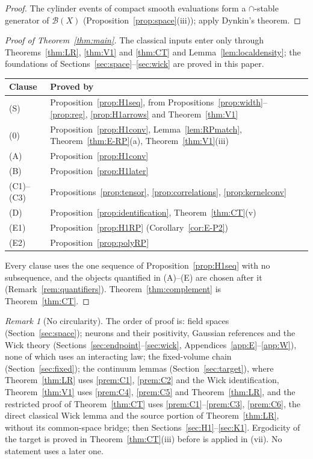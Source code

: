 \documentclass[11pt]{article}
\theoremstyle{plain}
\theoremstyle{definition}
\theoremstyle{remark}
\newtheorem{remark}[theorem]{Remark}
\newcommand{\cB}{\mathcal{B}}
\begin{document}
\begin{proof}
The cylinder events of compact smooth evaluations form a $\cap$-stable generator of
$\cB(X)$ (Proposition~\ref{prop:space}(iii)); apply Dynkin's theorem.
\end{proof}

\begin{proof}[Proof of Theorem~\ref{thm:main}]
The classical inputs enter only through Theorems~\ref{thm:LR}, \ref{thm:V1} and
\ref{thm:CT} and Lemma~\ref{lem:localdensity}; the foundations of
Sections~\ref{sec:space}--\ref{sec:wick} are proved in this paper.
\begin{center}
\small
\begin{tabular}{@{}lp{}@{}}
\toprule
Clause & Proved by\\
\midrule
(S) & Proposition~\ref{prop:H1seq}, from Propositions~\ref{prop:width}--\ref{prop:reg}, \ref{prop:H1arrows} and Theorem~\ref{thm:V1}\\
(0) & Proposition~\ref{prop:H1conv}, Lemma~\ref{lem:RPmatch}, Theorem~\ref{thm:E-RP}(a), Theorem~\ref{thm:V1}(iii)\\
(A) & Proposition~\ref{prop:H1conv}\\
(B) & Proposition~\ref{prop:H1later}\\
(C1)--(C3) & Propositions~\ref{prop:tensor}, \ref{prop:correlations}, \ref{prop:kernelconv}\\
(D) & Proposition~\ref{prop:identification}, Theorem~\ref{thm:CT}(v)\\
(E1) & Proposition~\ref{prop:H1RP} (Corollary~\ref{cor:E-P2})\\
(E2) & Proposition~\ref{prop:polyRP}\\
\bottomrule
\end{tabular}
\end{center}
Every clause uses the one sequence of Proposition~\ref{prop:H1seq} with no
subsequence, and the objects quantified in (A)--(E) are chosen after it
(Remark~\ref{rem:quantifiers}). Theorem~\ref{thm:complement} is
Theorem~\ref{thm:CT}.
\end{proof}

\begin{remark}[No circularity]\label{rem:noncircular}
The order of proof is: field spaces (Section~\ref{sec:space}); neurons and their
positivity, Gaussian references and the Wick theory
(Sections~\ref{sec:endpoint}--\ref{sec:wick}, Appendices~\ref{app:E}--\ref{app:W}),
none of which uses an interacting law; the fixed-volume chain
(Section~\ref{sec:fixed}); the continuum lemmas (Section~\ref{sec:target}), where
Theorem~\ref{thm:LR} uses \ref{prem:C1}, \ref{prem:C2} and the Wick identification,
Theorem~\ref{thm:V1} uses \ref{prem:C4}, \ref{prem:C5} and Theorem~\ref{thm:LR}, and
the restricted proof of Theorem~\ref{thm:CT} uses \ref{prem:C1}--\ref{prem:C3},
\ref{prem:C6}, the direct classical Wick lemma and the source portion of
Theorem~\ref{thm:LR}, without its common-space bridge; then
Sections~\ref{sec:H1}--\ref{sec:K1}. Ergodicity of the target is proved in
Theorem~\ref{thm:CT}(iii) before \cite[Thm.~1.0]{FS1977} is applied in (vii). No
statement uses a later one.
\end{remark}
\end{document}
